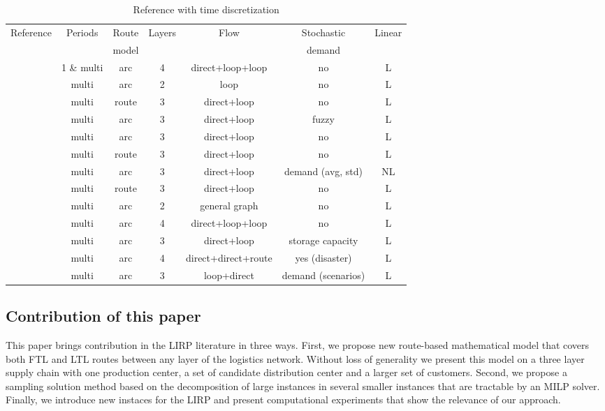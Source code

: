 \documentclass[a4paper,10pt]{article}
\begin{document}
\begin{linenumbers}
\begin{table}[htbp]
		\label{tab:synthese2}
		\scriptsize
	\begin{tabular}{lcccccc}
		\toprule
		Reference & Periods & Route & Layers   & Flow &  Stochastic & Linear  \\
					&          & model & 	   & 	   &     demand        &                      \\
		\midrule
\cite{AmbScu05}			&	1 \& multi	&	arc		&	4 	&	direct+loop+loop	&	no	&	L		\\
\cite{Zhang2014}		&	multi		&	arc  	&	2 	&	loop				&	no	&	L	\\
\cite{Guerrero2013}		&	multi		&	route	&	3 	&	direct+loop			&	no	&	L	\\
\cite{TavakkoliIFAC2016}&	multi		&	arc		&	3 	&	direct+loop			&	fuzzy 	&	L	\\
\cite{Ghorbani2016}		&	multi		&	arc		&	3 	&	direct+loop			&	no	&	L\\
\cite{Lehrlaly2016}		&	multi		&	route	&	3 	&	direct+loop			&	no	&	L		\\
\cite{Rayat2017}		&	multi		&	arc		&	3 	&	direct+loop			&	demand (avg, std)	&	NL		\\
\cite{Hiassat2017}		&	multi		&	route	&	3 	&	direct+loop			&	no	&	L		\\
\cite{Riquelme2016}		&	multi		&	arc		&	2 	&	general graph		&	no	&	L	\\
\cite{Tavana2018} 		&	multi		&	arc		&	4 	&	direct+loop+loop 	&	no	&	L		\\
\cite{Vahdani2018}		&	multi		&	arc		&	3 	&	direct+loop			&	storage capacity	&	L	\\
\cite{Eskandari2018}	&	multi		&	arc		&	4 	&	direct+direct+route	&	yes (disaster)	&	L		\\
\cite{Bashiri2018}		&	multi		&	arc		&	3 	&	loop+direct			&	demand (scenarios)	&	L	\\
		\bottomrule
	\end{tabular}
	\caption{Reference with time discretization}
\end{table}




\subsection{Contribution of this paper}

This paper brings contribution in the LIRP literature in three ways. First, we propose new route-based mathematical model that covers both FTL and LTL routes between any layer of the logistics network. Without loss of generality we present this model on a three layer supply chain with one production center, a set of candidate distribution center and a larger set of customers. 
Second, we propose a sampling solution method based on the decomposition of large instances in several smaller instances that are tractable by an MILP solver. 
Finally, we introduce new instaces for the LIRP and present computational experiments that show the relevance of our approach. 



\end{linenumbers}
\end{document}
